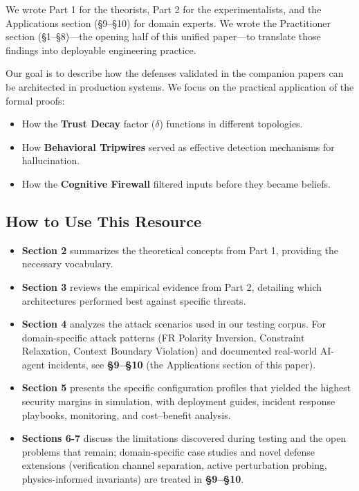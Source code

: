 \documentclass[
]{article}
\providecommand{\tightlist}{%
  \setlength{\itemsep}{0pt}\setlength{\parskip}{0pt}}
\begin{document}
We wrote Part 1 for the theorists, Part 2 for the experimentalists, and
the Applications section (§9--§10) for domain experts. We wrote the
Practitioner section (§1--§8)---the opening half of this unified
paper---to translate those findings into deployable engineering
practice.

Our goal is to describe how the defenses validated in the companion
papers can be architected in production systems. We focus on the
practical application of the formal proofs:

\begin{itemize}
\tightlist
\item
  How the \textbf{Trust Decay} factor (\(\delta\)) functions in
  different topologies.
\item
  How \textbf{Behavioral Tripwires} served as effective detection
  mechanisms for hallucination.
\item
  How the \textbf{Cognitive Firewall} filtered inputs before they became
  beliefs.
\end{itemize}

\subsection{How to Use This Resource}\label{how-to-use-this-resource}

\begin{itemize}
\tightlist
\item
  \textbf{Section 2} summarizes the theoretical concepts from Part 1,
  providing the necessary vocabulary.
\item
  \textbf{Section 3} reviews the empirical evidence from Part 2,
  detailing which architectures performed best against specific threats.
\item
  \textbf{Section 4} analyzes the attack scenarios used in our testing
  corpus. For domain-specific attack patterns (FR Polarity Inversion,
  Constraint Relaxation, Context Boundary Violation) and documented
  real-world AI-agent incidents, see \textbf{§9--§10} (the Applications
  section of this paper).
\item
  \textbf{Section 5} presents the specific configuration profiles that
  yielded the highest security margins in simulation, with deployment
  guides, incident response playbooks, monitoring, and cost--benefit
  analysis.
\item
  \textbf{Sections 6-7} discuss the limitations discovered during
  testing and the open problems that remain; domain-specific case
  studies and novel defense extensions (verification channel separation,
  active perturbation probing, physics-informed invariants) are treated
  in \textbf{§9--§10}.
\end{itemize}
\end{document}
